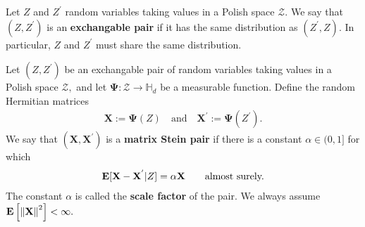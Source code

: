 \begin{definition}
  Let 
  $Z$ and $Z^{'}$
  random variables taking values
  in a Polish space $\mathcal{Z}.$
  We say that
  $
  (
    Z
    ,
    Z^{'}
  )
  $
  is an \textbf{exchangable pair}
  if it has the same distribution as 
  $
  (
  Z^{'}
    ,
    Z
  )
  .
  $
  In particular, 
  $Z$ and $Z^{'}$
  must share the same distribution.

\end{definition}
\begin{definition}
  Let
  $
  (
    Z
    ,
    Z^{'}
  )
  $
  be an exchangable pair of random variables taking values
  in a Polish space $\mathcal{Z},$
  and let 
  $
    \mathbf{\Psi}
    : 
    \mathcal{Z}
    \to 
  \mathbb{H}_d
  $
  be a measurable function.
  Define the random Hermitian matrices
  \begin{gather}
    \mathbf{X}
    :=
    \mathbf{\Psi}
    (Z)
    \quad
    \text{and}
    \quad
    \mathbf{X}^{'}
    :=
    \mathbf{\Psi}
    (Z^{'})
    .
  \end{gather}
  We say that 
  $
  (
    \mathbf{X}
    ,
    \mathbf{X}^{'}
  )
  $
  is a \textbf{matrix Stein pair}
  if there is a constant 
  $\alpha\in (0,1]$
  for which
  \begin{gather}
    \mathbf{E}[
    \mathbf{X}
    -
    \mathbf{X}^{'}
    \vert
    Z
    ]
    =
    \alpha 
    \mathbf{X}
    \qquad
    \text{almost surely.}
  \end{gather}
  The constant 
  $\alpha$
  is called the \textbf{scale factor} of the pair.
  We always assume 
  $
    \mathbf{E}
    \left[ 
      \left\lVert\mathbf{X}\right\rVert^2
    \right]
    <
    \infty
    .
  $
\end{definition}


